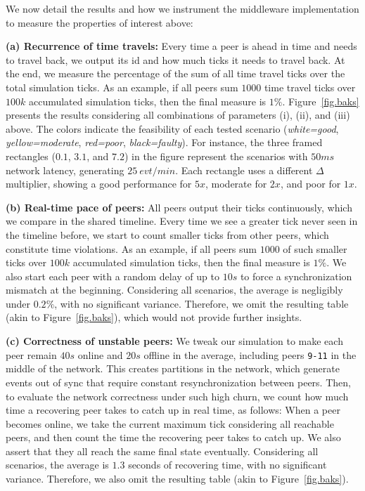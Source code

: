 \documentclass[10pt,journal,compsoc]{IEEEtran}
\newcommand{\code}[1]  {\texttt{\small{#1}}}
\begin{document}
We now detail the results and how we instrument the middleware implementation
to measure the properties of interest above:

\textbf{(a) Recurrence of time travels:}
Every time a peer is ahead in time and needs to travel back, we output its id
and how much ticks it needs to travel back.
At the end, we measure the percentage of the sum of all time travel ticks over
the total simulation ticks.
As an example, if all peers sum $1000$ time travel ticks over $100k$
accumulated simulation ticks, then the final measure is $1\%$.
%
Figure~\ref{fig.baks} presents the results considering all combinations of
parameters (i), (ii), and (iii) above.
The colors indicate the feasibility of each tested scenario
    (\emph{white=good}, \emph{yellow=moderate}, \emph{red=poor},
    \emph{black=faulty}).
%
For instance, the three framed rectangles ($0.1$, $3.1$, and $7.2$) in the
figure represent the scenarios with $50ms$ network latency, generating
$25~evt/min$.
Each rectangle uses a different $\Delta$ multiplier, showing a good performance
for $5x$, moderate for $2x$, and poor for $1x$.

\textbf{(b) Real-time pace of peers:}
All peers output their ticks continuously, which we compare in the shared
timeline.
Every time we see a greater tick never seen in the timeline before, we start to
count smaller ticks from other peers, which constitute time violations.
As an example, if all peers sum $1000$ of such smaller ticks over $100k$
accumulated simulation ticks, then the final measure is $1\%$.
%
We also start each peer with a random delay of up to $10s$ to force a
synchronization mismatch at the beginning.
%
Considering all scenarios, the average is negligibly under $0.2\%$, with no
significant variance.
Therefore, we omit the resulting table (akin to Figure~\ref{fig.baks}), which
would not provide further insights.

\textbf{(c) Correctness of unstable peers:}
We tweak our simulation to make each peer remain $40s$ online and $20s$
offline in the average, including peers \code{9-11} in the middle of the
network.
This creates partitions in the network, which generate events out of sync that
require constant resynchronization between peers.
%
Then, to evaluate the network correctness under such high churn, we count how
much time a recovering peer takes to catch up in real time, as follows:
When a peer becomes online, we take the current maximum tick considering all
reachable peers, and then count the time the recovering peer takes to catch up.
We also assert that they all reach the same final state eventually.
%
Considering all scenarios, the average is $1.3$ seconds of recovering time,
with no significant variance.
Therefore, we also omit the resulting table (akin to Figure~\ref{fig.baks}).
\end{document}
